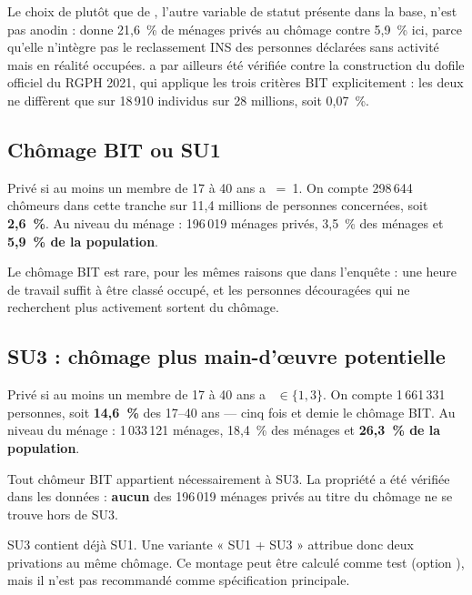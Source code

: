 \documentclass[11pt,a4paper]{article}
\begin{document}
Le choix de  plutôt que de , l'autre variable de statut
présente dans la base, n'est pas anodin :  donne 21,6~\% de ménages privés au
chômage contre 5,9~\% ici, parce qu'elle n'intègre pas le reclassement INS des personnes
déclarées sans activité mais en réalité occupées.  a par ailleurs été
vérifiée contre la construction du dofile officiel du RGPH 2021, qui applique les trois critères
BIT explicitement : les deux ne diffèrent que sur 18\,910 individus sur 28 millions, soit
0,07~\%.

\subsection{Chômage BIT ou SU1}

Privé si au moins un membre de 17 à 40 ans a ~=~1. On compte 298\,644
chômeurs dans cette tranche sur 11,4 millions de personnes concernées, soit \textbf{2,6~\%}. Au
niveau du ménage : 196\,019 ménages privés, 3,5~\% des ménages et \textbf{5,9~\% de la
population}.

Le chômage BIT est rare, pour les mêmes raisons que dans l'enquête : une heure de travail suffit
à être classé occupé, et les personnes découragées qui ne recherchent plus activement sortent du
chômage.

\subsection{SU3 : chômage plus main-d'{\oe}uvre potentielle}

Privé si au moins un membre de 17 à 40 ans a ~$\in \{1,3\}$. On compte
1\,661\,331 personnes, soit \textbf{14,6~\%} des 17--40 ans --- cinq fois et demie le chômage
BIT. Au niveau du ménage : 1\,033\,121 ménages, 18,4~\% des ménages et \textbf{26,3~\% de la
population}.

Tout chômeur BIT appartient nécessairement à SU3. La propriété a été vérifiée dans les données :
\textbf{aucun} des 196\,019 ménages privés au titre du chômage ne se trouve hors de SU3.

\begin{attention}
SU3 contient déjà SU1. Une variante « SU1 + SU3 » attribue donc deux privations au même chômage.
Ce montage peut être calculé comme test (option ), mais il n'est pas recommandé
comme spécification principale.
\end{attention}
\end{document}
